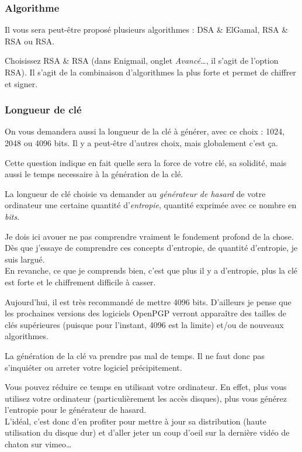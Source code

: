 \subsubsection{Algorithme}\label{algorithme}

Il vous sera peut-être proposé plusieurs algorithmes : DSA \& ElGamal,
RSA \& RSA ou RSA.

Choisissez RSA \& RSA (dans Enigmail, onglet \emph{Avancé\ldots{}}, il
s'agit de l'option RSA). Il s'agit de la combinaison d'algorithmes la
plus forte et permet de chiffrer et signer.

\subsubsection{Longueur de clé}\label{longueur-de-cluxe9}

On vous demandera aussi la longueur de la clé à générer, avec ce choix :
1024, 2048 ou 4096 bits. Il y a peut-être d'autres choix, mais
globalement c'est ça.

Cette question indique en fait quelle sera la force de votre clé, sa
solidité, mais aussi le temps necessaire à la génération de la clé.

La longueur de clé choisie va demander au \emph{générateur de hasard} de
votre ordinateur une certaine quantité d'\emph{entropie}, quantité
exprimée avec ce nombre en \emph{bits}.

\begin{notice}
Je dois ici avouer ne pas comprendre vraiment le fondement profond de la
chose.\\Dès que j'essaye de comprendre ces concepts d'entropie, de
quantité d'entropie, je suis largué.\\En revanche, ce que je comprends
bien, c'est que plus il y a d'entropie, plus la clé est forte et le
chiffrement difficile à casser.
\end{notice}

Aujourd'hui, il est très recommandé de mettre 4096 bits. D'ailleurs je
pense que les prochaines versions des logiciels OpenPGP verront
apparaître des tailles de clés supérieures (puisque pour l'instant, 4096
est la limite) et/ou de nouveaux algorithmes.

La génération de la clé va prendre pas mal de temps. Il ne faut donc pas
s'inquiéter ou arreter votre logiciel précipitement.

Vous pouvez réduire ce temps en utilisant votre ordinateur. En effet,
plus vous utilisez votre ordinateur (particulièrement les accès
disques), plus vous générez l'entropie pour le générateur de
hasard.\\L'idéal, c'est donc d'en profiter pour mettre à jour sa
distribution (haute utilisation du disque dur) et d'aller jeter un coup
d'oeil sur la dernière vidéo de chaton sur vimeo\ldots{}

